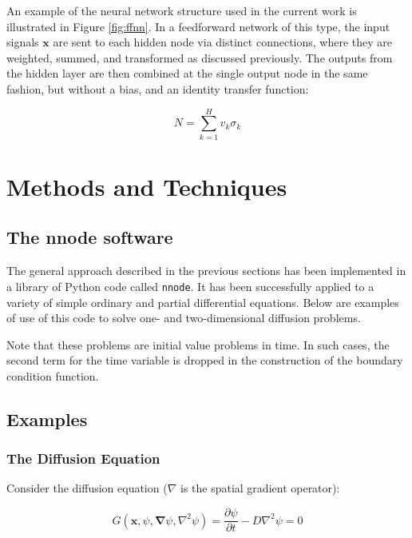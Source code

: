 \documentclass{article}
\begin{document}
An example of the neural network structure used in the current work is illustrated in Figure \ref{fig:ffnn}. In a feedforward network of this type, the input signals $\mathbf x$ are sent to each hidden node via distinct connections, where they are weighted, summed, and transformed as discussed previously. The outputs from the hidden layer are then combined at the single output node in the same fashion, but without a bias, and an identity transfer function:

\begin{equation}
  N = \sum_{k=1}^H v_k \sigma_k
\end{equation}


\newpage

\section{Methods and Techniques}

\subsection{The nnode software}

The general approach described in the previous sections has been implemented in a library of Python code called \texttt{nnode}. It has been successfully applied to a variety of simple ordinary and partial differential equations. Below are examples of use of this code to solve one- and two-dimensional diffusion problems.

Note that these problems are initial value problems in time. In such cases, the second term for the time variable is dropped in the construction of the boundary condition function.

\subsection{Examples}

\subsubsection{The Diffusion Equation}

Consider the diffusion equation ($\nabla$ is the spatial gradient operator):

\begin{equation}
  G \left( \mathbf x, \psi, \mathbf \nabla \psi, \nabla^2 \psi \right) = \frac {\partial \psi} {\partial t} - D \nabla^2 \psi = 0
\end{equation}
\end{document}
